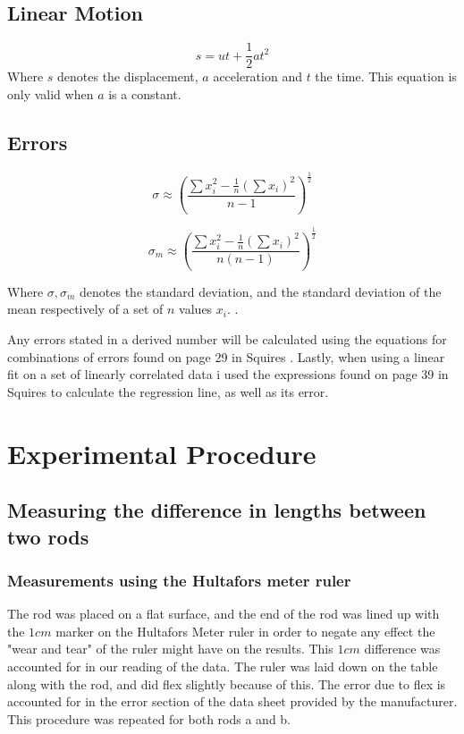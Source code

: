 \documentclass[11pt,a4paper]{article}
\begin{document}
  \subsection{Linear Motion}
    \begin{equation}
      s = ut + \frac{1}{2}at^2
    \end{equation}
    Where $s$ denotes the displacement, $a$ acceleration and $t$ the time. This equation is only valid when $a$ is a constant.

  \subsection{Errors}
    \begin{equation}
    \label{eqn:sigma}
      \sigma \approx \left(
      \frac{\sum x_i^2 - \frac{1}{n}(\sum x_i)^2}
      {n - 1}
      \right)^\frac{1}{2}
    \end{equation}
    
    \begin{equation}
      \label{eqn:sigma_m}
      \sigma_m \approx \left(
      \frac{\sum x_i^2 - \frac{1}{n}(\sum x_i)^2}
      {n(n - 1)}
      \right)^\frac{1}{2}
    \end{equation}

    Where $\sigma, \sigma_m$ denotes the standard deviation, and the standard deviation of the mean respectively of a set of $n$ values $x_i$. \cite{squires}.

    Any errors stated in a derived number will be calculated using the equations for combinations of errors found on page 29 in Squires \cite{squires}. Lastly, when using a linear fit on a set of linearly correlated data i used the expressions found on page 39 in Squires \cite{squires} to calculate the regression line, as well as its error.

\section{\label{sec:exp_proced}Experimental Procedure}
 
  \subsection{Measuring the difference in lengths between two rods}
    \subsubsection{Measurements using the Hultafors meter ruler}
      The rod was placed on a flat surface, and the end of the rod was lined up with the $1cm$ marker on the Hultafors Meter ruler in order to negate any effect the "wear and tear" of the ruler might have on the results. This $1cm$ difference was accounted for in our reading of the data. The ruler was laid down on the table along with the rod, and did flex slightly because of this. The error due to flex is accounted for in the error section of the data sheet provided by the manufacturer. This procedure was repeated for both rods a and b.
\end{document}
